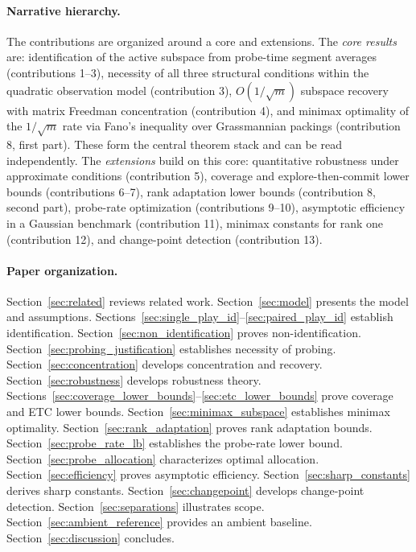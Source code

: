\documentclass[12pt]{article}
\theoremstyle{plain}
\theoremstyle{definition}
\begin{document}
\paragraph{Narrative hierarchy.}
The contributions are organized around a core and extensions. The \emph{core results} are: identification of the active subspace from probe-time segment averages (contributions 1--3), necessity of all three structural conditions within the quadratic observation model (contribution 3), $O(1/\sqrt{m})$ subspace recovery with matrix Freedman concentration (contribution 4), and minimax optimality of the $1/\sqrt{m}$ rate via Fano's inequality over Grassmannian packings (contribution 8, first part). These form the central theorem stack and can be read independently. The \emph{extensions} build on this core: quantitative robustness under approximate conditions (contribution 5), coverage and explore-then-commit lower bounds (contributions 6--7), rank adaptation lower bounds (contribution 8, second part), probe-rate optimization (contributions 9--10), asymptotic efficiency in a Gaussian benchmark (contribution 11), minimax constants for rank one (contribution 12), and change-point detection (contribution 13).

\paragraph{Paper organization.}
Section~\ref{sec:related} reviews related work. Section~\ref{sec:model} presents the model and assumptions. Sections~\ref{sec:single_play_id}--\ref{sec:paired_play_id} establish identification. Section~\ref{sec:non_identification} proves non-identification. Section~\ref{sec:probing_justification} establishes necessity of probing. Section~\ref{sec:concentration} develops concentration and recovery. Section~\ref{sec:robustness} develops robustness theory. Sections~\ref{sec:coverage_lower_bounds}--\ref{sec:etc_lower_bounds} prove coverage and ETC lower bounds. Section~\ref{sec:minimax_subspace} establishes minimax optimality. Section~\ref{sec:rank_adaptation} proves rank adaptation bounds. Section~\ref{sec:probe_rate_lb} establishes the probe-rate lower bound. Section~\ref{sec:probe_allocation} characterizes optimal allocation. Section~\ref{sec:efficiency} proves asymptotic efficiency. Section~\ref{sec:sharp_constants} derives sharp constants. Section~\ref{sec:changepoint} develops change-point detection. Section~\ref{sec:separations} illustrates scope. Section~\ref{sec:ambient_reference} provides an ambient baseline. Section~\ref{sec:discussion} concludes.
\end{document}
